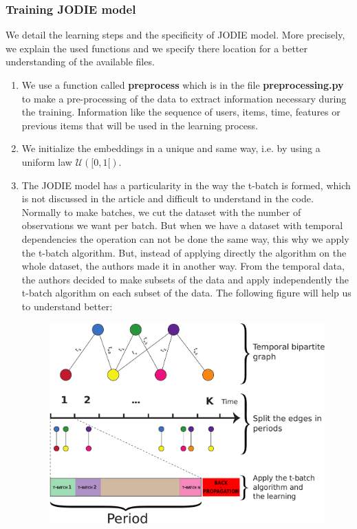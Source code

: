 \subsubsection{Training JODIE model} 

We detail the learning steps and the specificity of JODIE model. More precisely, we explain the used functions and we specify there location for a better understanding of the available files.

\begin{enumerate}
    \item We use a function called \textbf{preprocess} which is in the file \textbf{preprocessing.py} to make a pre-processing of the data to extract information necessary during the training. Information like the sequence of users, items, time, features or previous items that will be used in the learning process.
    \item We initialize the embeddings in a unique and same way, i.e. by using a uniform law $\mathcal{U}([0,1[)$.
    \item The JODIE model has a particularity in the way the t-batch is formed, which is not discussed in the article and difficult to understand in the code. Normally to make batches, we cut the dataset with the number of observations we want per batch. But when we have a dataset with temporal dependencies the operation can not be done the same way, this why we apply the t-batch algorithm. But, instead of applying directly the algorithm on the whole dataset, the authors made it in another way. From the temporal data, the authors decided to make subsets of the data and apply independently the t-batch algorithm on each subset of the data. The following figure will help us to understand better:
    \begin{figure}[H]
        \centering
        \includegraphics[scale = 0.5]{image/pipeline-jodie.pdf}

\end{figure}
\end{enumerate}
